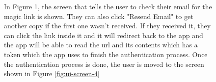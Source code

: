 \begin{figure}[!h]
\begin{minipage}{0.3\textwidth}
        \label{fig:ui-screen-3}
    \end{minipage}
    \hfill
    \begin{minipage}{0.65\textwidth}
        In Figure \ref{fig:ui-screen-3}, the screen that tells the user to check their email for the magic link is shown. They can also click "Resend Email" to get another copy if the first one wasn't received. If they received it, they can click the link inside it and it will redirect back to the app and the app will be able to read the url and its contents which has a token which the app uses to finish the authentication process. Once the authentication process is done, the user is moved to the screen shown in Figure \ref{fig:ui-screen-4}
    \end{minipage}
\end{figure}

